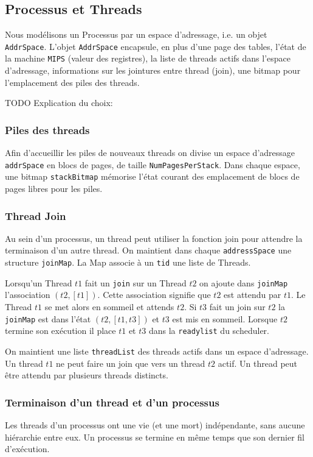 \documentclass[11pt]{article}
\begin{document}
\subsection{Processus et Threads}
Nous modélisons un Processus par un espace d'adressage, i.e. un objet \texttt{AddrSpace}.
L'objet \texttt{AddrSpace} encapsule, en plus d'une page des tables, l'état de la machine \texttt{MIPS}
(valeur des registres), la liste de threads actifs dans l'espace d'adressage,
informations sur les jointures entre thread (join), une bitmap pour l'emplacement des piles des threads.

TODO Explication du choix:

\subsubsection{Piles des threads}
Afin d'accueillir les piles de nouveaux threads on divise un espace d'adressage \texttt{addrSpace}
en blocs de pages, de taille \texttt{NumPagesPerStack}.
Dans chaque espace, une bitmap \texttt{stackBitmap} mémorise l'état courant des emplacement de blocs de
pages libres pour les piles.

\subsubsection{Thread Join}
Au sein d'un processus, un thread peut utiliser la fonction join pour attendre la terminaison d'un autre thread.
On maintient dans chaque \texttt{addressSpace} une structure \texttt{joinMap}.
La Map associe à un \texttt{tid} une liste de Threads.

Lorsqu'un Thread $t1$ fait un \texttt{join} sur un Thread $t2$ on ajoute dans \texttt{joinMap}
l'association $(t2, [t1])$. Cette association signifie que $t2$ est attendu par $t1$.
Le Thread $t1$ se met alors en sommeil et attends $t2$. 
Si $t3$ fait un join sur $t2$ la \texttt{joinMap} est dans l'état $(t2, [t1,t3])$ et $t3$ est mis en sommeil.
Lorsque $t2$ termine son exécution il place $t1$ et $t3$ dans la \texttt{readylist} du scheduler.

On maintient une liste \texttt{threadList} des threads actifs dans un espace d'adressage.
Un thread $t1$ ne peut faire un join que vers un thread $t2$ actif.
Un thread peut être attendu par plusieurs threads distincts.


\subsubsection{Terminaison d'un thread et d'un processus}
Les threads d'un processus ont une vie (et une mort) indépendante, sans aucune hiérarchie entre eux.
Un processus se termine en même temps que son dernier fil d'exécution.
\end{document}
